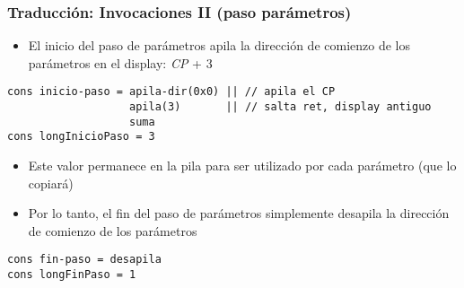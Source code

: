 \documentclass[hyperref={pdfpagelabels=false},tree-dvips,compress]{beamer}
\begin{document}
\begin{frame}[fragile]
\frametitle{Traducción: Invocaciones II (paso parámetros)}

\begin{itemize}
	\item El inicio del paso de parámetros apila la dirección de comienzo de los parámetros en el display: \emph{CP} + 3
\end{itemize}

\begin{lstlisting}[style=codigoMP,basicstyle=\scriptsize\ttfamily,mathescape]
cons inicio-paso = apila-dir(0x0) || // apila el CP
                   apila(3)       || // salta ret, display antiguo
                   suma
cons longInicioPaso = 3
\end{lstlisting}

\begin{itemize}
	\item Este valor permanece en la pila para ser utilizado por cada parámetro (que lo copiará)
\end{itemize}

\begin{itemize}
	\item Por lo tanto, el fin del paso de parámetros simplemente desapila la dirección de comienzo de los parámetros
\end{itemize}

\begin{lstlisting}[style=codigoMP,basicstyle=\scriptsize\ttfamily,mathescape]
cons fin-paso = desapila
cons longFinPaso = 1
\end{lstlisting}


\end{frame}
\end{document}
